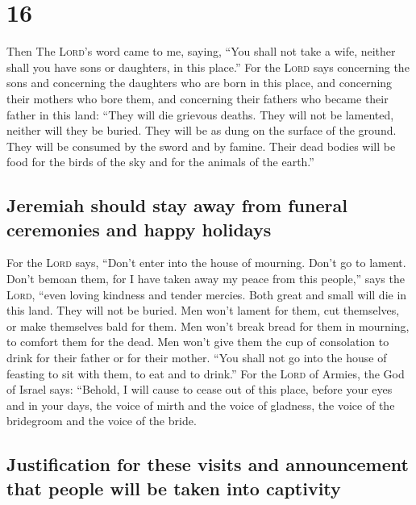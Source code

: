\hypertarget{section-15}{%
\section{16}\label{section-15}}

 Then The \textsc{Lord}'s word came to me, saying,
 ``You shall not take a wife, neither shall you have sons
or daughters, in this place.''  For the \textsc{Lord} says
concerning the sons and concerning the daughters who are born in this
place, and concerning their mothers who bore them, and concerning their
fathers who became their father in this land:  ``They will
die grievous deaths. They will not be lamented, neither will they be
buried. They will be as dung on the surface of the ground. They will be
consumed by the sword and by famine. Their dead bodies will be food for
the birds of the sky and for the animals of the earth.''

\hypertarget{jeremiah-should-stay-away-from-funeral-ceremonies-and-happy-holidays}{%
\subsection{Jeremiah should stay away from funeral ceremonies and happy
holidays}\label{jeremiah-should-stay-away-from-funeral-ceremonies-and-happy-holidays}}

 For the \textsc{Lord} says, ``Don't enter into the house
of mourning. Don't go to lament. Don't bemoan them, for I have taken
away my peace from this people,'' says the \textsc{Lord}, ``even loving
kindness and tender mercies.  Both great and small will
die in this land. They will not be buried. Men won't lament for them,
cut themselves, or make themselves bald for them.  Men
won't break bread for them in mourning, to comfort them for the dead.
Men won't give them the cup of consolation to drink for their father or
for their mother.  ``You shall not go into the house of
feasting to sit with them, to eat and to drink.''  For the
\textsc{Lord} of Armies, the God of Israel says: ``Behold, I will cause
to cease out of this place, before your eyes and in your days, the voice
of mirth and the voice of gladness, the voice of the bridegroom and the
voice of the bride.

\hypertarget{justification-for-these-visits-and-announcement-that-people-will-be-taken-into-captivity}{%
\subsection{Justification for these visits and announcement that people
will be taken into
captivity}\label{justification-for-these-visits-and-announcement-that-people-will-be-taken-into-captivity}}

